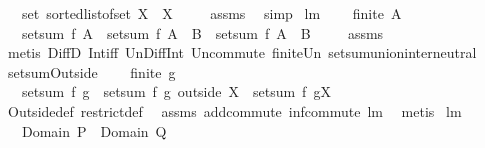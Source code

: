 \begin{isabellebody}
\ \ \ {\isachardoublequoteopen}set\ {\isacharparenleft}sorted{\isacharunderscore}list{\isacharunderscore}of{\isacharunderscore}set\ X{\isacharparenright}\ {\isacharequal}\ X{\isachardoublequoteclose}\ \isanewline
%
\isadelimproof
\ \ %
\endisadelimproof
%
\isatagproof
{}\isamarkupfalse%
\ assms\ \isamarkupfalse%
\ simp%
\endisatagproof
{\isafoldproof}%
%
\isadelimproof
\isanewline
%
\endisadelimproof
\isanewline
\isanewline
{}\isamarkupfalse%
\ lm{}{}{}{\isacharcolon}\ \isanewline
\ \ \ {\isachardoublequoteopen}finite\ A{\isachardoublequoteclose}\ \isanewline
\ \ \ {\isachardoublequoteopen}setsum\ f\ A\ {\isacharequal}\ setsum\ f\ {\isacharparenleft}A\ {\isasyminter}\ B{\isacharparenright}\ {\isacharplus}\ setsum\ f\ {\isacharparenleft}A\ {\isacharminus}\ B{\isacharparenright}{\isachardoublequoteclose}\ \isanewline
%
\isadelimproof
\ \ %
\endisadelimproof
%
\isatagproof
{}\isamarkupfalse%
\ assms\ \isamarkupfalse%
\ {\isacharparenleft}metis\ DiffD{}\ Int{\isacharunderscore}iff\ Un{\isacharunderscore}Diff{\isacharunderscore}Int\ Un{\isacharunderscore}commute\ finite{\isacharunderscore}Un\ setsum{\isachardot}union{\isacharunderscore}inter{\isacharunderscore}neutral{\isacharparenright}%
\endisatagproof
{\isafoldproof}%
%
\isadelimproof
\isanewline
%
\endisadelimproof
\isanewline
{}\isamarkupfalse%
\ setsumOutside{\isacharcolon}\ \isanewline
\ \ \ {\isachardoublequoteopen}finite\ g{\isachardoublequoteclose}\ \isanewline
\ \ \ {\isachardoublequoteopen}setsum\ f\ g\ {\isacharequal}\ setsum\ f\ {\isacharparenleft}g\ outside\ X{\isacharparenright}\ {\isacharplus}\ {\isacharparenleft}setsum\ f\ {\isacharparenleft}g{\isacharbar}{\isacharbar}X{\isacharparenright}{\isacharparenright}{\isachardoublequoteclose}\ \isanewline
%
\isadelimproof
\ \ %
\endisadelimproof
%
\isatagproof
{}\isamarkupfalse%
\ Outside{\isacharunderscore}def\ restrict{\isacharunderscore}def\ \isamarkupfalse%
\ assms\ add{\isachardot}commute\ inf{\isacharunderscore}commute\ lm{}{}{}\ \isamarkupfalse%
\ {\isacharparenleft}metis{\isacharparenright}%
\endisatagproof
{\isafoldproof}%
%
\isadelimproof
\isanewline
%
\endisadelimproof
\isanewline
{}\isamarkupfalse%
\ lm{}{}{}{\isacharcolon}\ \isanewline
\ \ \ {\isachardoublequoteopen}{\isacharparenleft}Domain\ P\ {\isasymsubseteq}\ Domain\ Q{\isacharparenright}{\isachardoublequoteclose}\ \isanewline

\end{isabellebody}
